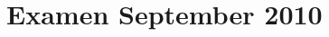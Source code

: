 \documentclass[lineaire_algebra_oplossingen.tex]{subfiles}
\begin{document}
\section{Examen September 2010}
\end{document}
